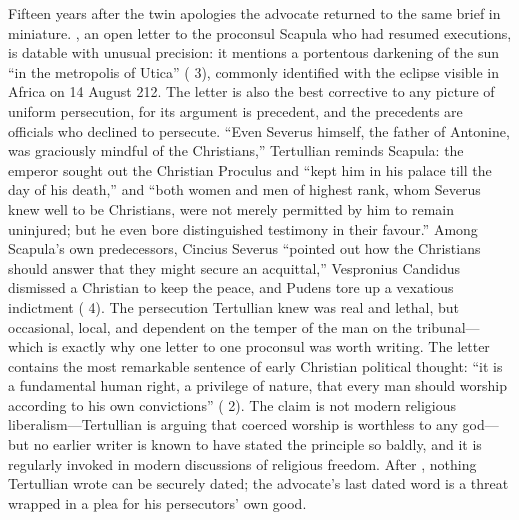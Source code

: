 Fifteen years after the twin apologies the advocate returned to the same brief
in miniature. , an open letter to the proconsul Scapula who
had resumed executions, is datable with unusual precision: it mentions a
portentous darkening of the sun ``in the metropolis of Utica'' ( 3), commonly identified with the eclipse visible in Africa on 14
August 212. The letter is also the best corrective to any picture of
uniform persecution, for its argument is precedent, and the precedents are
officials who declined to persecute. ``Even Severus himself, the father of
Antonine, was graciously mindful of the Christians,'' Tertullian reminds
Scapula: the emperor sought out the Christian Proculus and ``kept him in his
palace till the day of his death,'' and ``both women and men of highest rank,
whom Severus knew well to be Christians, were not merely permitted by him to
remain uninjured; but he even bore distinguished testimony in their favour.''
Among Scapula's own predecessors, Cincius Severus ``pointed out how the
Christians should answer that they might secure an acquittal,'' Vespronius
Candidus dismissed a Christian to keep the peace, and Pudens tore up a
vexatious indictment ( 4). The persecution Tertullian knew
was real and lethal, but occasional, local, and dependent on the temper of
the man on the tribunal---which is exactly why one letter to one proconsul
was worth writing. The letter contains the most remarkable sentence of early
Christian political thought: ``it is a fundamental human right, a privilege of
nature, that every man should worship according to his own convictions''
( 2). The claim is not modern religious
liberalism---Tertullian is arguing that coerced worship is worthless to any
god---but no earlier writer is known to have stated the principle so baldly,
and it is regularly invoked in modern discussions of religious freedom. After
, nothing Tertullian wrote can be securely dated; the
advocate's last dated word is a threat wrapped in a plea for his persecutors'
own good.
